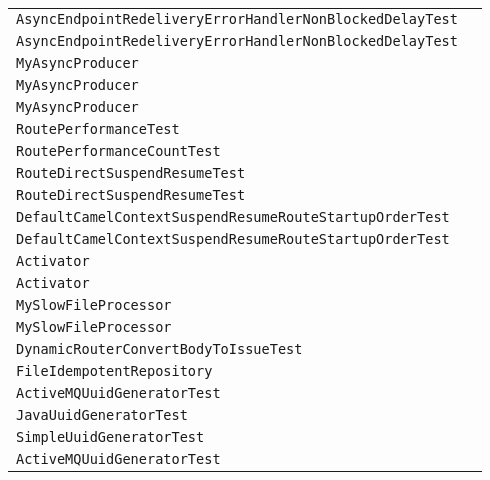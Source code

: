\begin{center}
\begin{tabular}{ll}
\lstinline/AsyncEndpointRedeliveryErrorHandlerNonBlockedDelayTest/&\raisebox{0pt}{\lstinline/process(Exchange)/}\\
\lstinline/AsyncEndpointRedeliveryErrorHandlerNonBlockedDelayTest/&\raisebox{0pt}{\lstinline/process(Exchange)/}\\
\lstinline/MyAsyncProducer/&\raisebox{0pt}{\lstinline/Objectcall()/}\\
\lstinline/MyAsyncProducer/&\raisebox{0pt}{\lstinline/Objectcall()/}\\
\lstinline/MyAsyncProducer/&\raisebox{0pt}{\lstinline/booleanprocess(Exchange,AsyncCallback)/}\\
\lstinline/RoutePerformanceTest/&\raisebox{0pt}{\lstinline/testPerformance()/}\\
\lstinline/RoutePerformanceCountTest/&\raisebox{0pt}{\lstinline/testSendMessages()/}\\
\lstinline/RouteDirectSuspendResumeTest/&\raisebox{0pt}{\lstinline/testSuspendResume()/}\\
\lstinline/RouteDirectSuspendResumeTest/&\raisebox{0pt}{\lstinline/testSuspendResume()/}\\
\lstinline/DefaultCamelContextSuspendResumeRouteStartupOrderTest/&\raisebox{0pt}{\lstinline/testSuspendResume()/}\\
\lstinline/DefaultCamelContextSuspendResumeRouteStartupOrderTest/&\raisebox{0pt}{\lstinline/testSuspendResume()/}\\
\lstinline/Activator/&\raisebox{0pt}{\lstinline/start(BundleContext)/}\\
\lstinline/Activator/&\raisebox{0pt}{\lstinline/start(BundleContext)/}\\
\lstinline/MySlowFileProcessor/&\raisebox{0pt}{\lstinline/process(Exchange)/}\\
\lstinline/MySlowFileProcessor/&\raisebox{0pt}{\lstinline/process(Exchange)/}\\
\lstinline/DynamicRouterConvertBodyToIssueTest/&\raisebox{0pt}{\lstinline/process(Exchange)/}\\
\lstinline/FileIdempotentRepository/&\raisebox{0pt}{\lstinline/trunkStore()/}\\
\lstinline/ActiveMQUuidGeneratorTest/&\raisebox{0pt}{\lstinline/testPerformance()/}\\
\lstinline/JavaUuidGeneratorTest/&\raisebox{0pt}{\lstinline/testPerformance()/}\\
\lstinline/SimpleUuidGeneratorTest/&\raisebox{0pt}{\lstinline/testPerformance()/}\\
\lstinline/ActiveMQUuidGeneratorTest/&\raisebox{0pt}{\lstinline/testPerformance()/}\\

\end{tabular}
\end{center}
